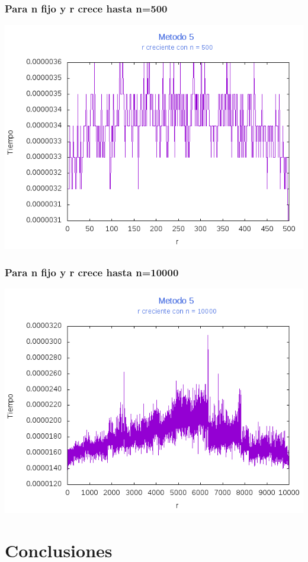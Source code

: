 \documentclass[12pt,letterpaper]{scrartcl}
\begin{document}
\subsubsection{Para n fijo y r crece hasta n=500}
\includegraphics[scale=1]{Metodo5/plot500m5}

\subsubsection{Para n fijo y r crece hasta n=10000}
\includegraphics[scale=1]{Metodo5/plot10000m5}

\newpage
\section{Conclusiones}
\end{document}
